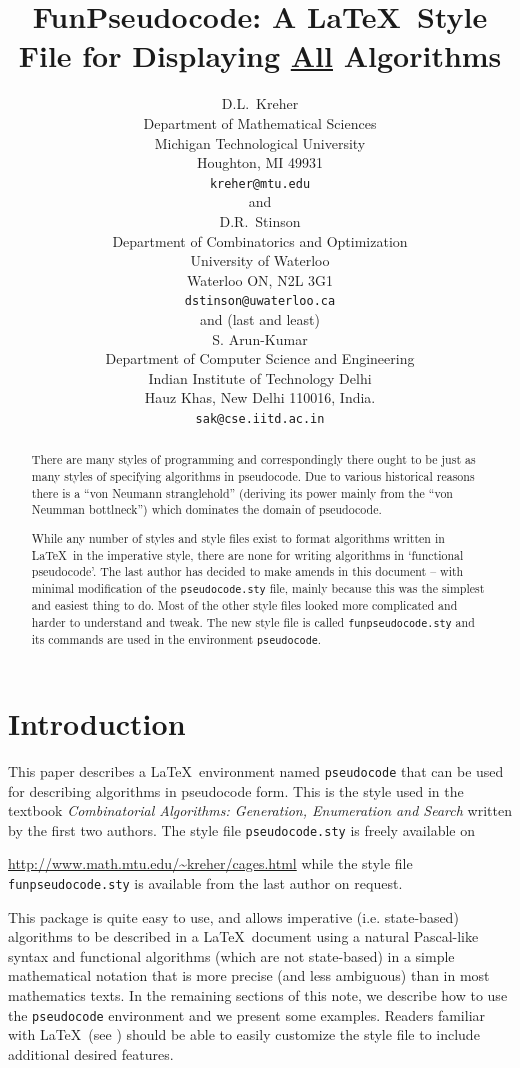 \documentclass[a4]{article}
\title{FunPseudocode: A \LaTeX\  Style File for Displaying \underline{All} Algorithms}
\author{
D.L.\ Kreher\\
Department of Mathematical Sciences\\
Michigan Technological University \\ 
Houghton, MI 49931\\
{\tt kreher@mtu.edu}\\[1ex]
and \\[1ex]
D.R.\ Stinson\\
Department of Combinatorics and Optimization\\
University of Waterloo\\
Waterloo ON, N2L 3G1\\
{\tt dstinson@uwaterloo.ca}\\[1ex]
and (last and least)\\[1ex]
S. Arun-Kumar\\
Department of Computer Science and Engineering\\
Indian Institute of Technology Delhi\\
Hauz Khas, New Delhi 110016, India.\\
{\tt sak@cse.iitd.ac.in}
}
\newcommand{\keyword}[1]{\texttt{#1}}
\begin{document}

\maketitle
\begin{abstract}
  There are many styles of programming and correspondingly there 
  ought to be just as many styles of specifying algorithms in pseudocode.
  Due to various historical reasons there is a ``von Neumann 
  stranglehold'' (deriving its power mainly from the ``von
  Neumman bottlneck''\cite{backus}) which dominates the domain of pseudocode. 

  While any number of styles and style files exist to format algorithms written
  in \LaTeX\ in the imperative style, there are none for writing algorithms in
  `functional pseudocode'. The last author has decided to make amends in this
  document -- with minimal modification of the {\tt pseudocode.sty} file, mainly
  because this was the simplest and easiest thing to do. Most of the other style
  files looked more complicated and harder to understand and tweak. The new
  style file is called \keyword{funpseudocode.sty} and its commands are used in
  the environment \keyword{pseudocode}. 
\end{abstract}

\section{Introduction}

This paper describes a \LaTeX\ environment named \keyword{pseudocode}
that can be used for describing algorithms in pseudocode form.  This
is the style used in the %
textbook {\em Combinatorial Algorithms: Generation, Enumeration and Search}
  \cite{cages} written by the first two authors.
The style file \keyword{pseudocode.sty} is freely available on

\url{http://www.math.mtu.edu/~kreher/cages.html}
while the style file \keyword{funpseudocode.sty} is available from the last
author on request.


This package is quite easy to use, and allows imperative (i.e. state-based)
algorithms to be described in a \LaTeX\ document using a natural Pascal-like
syntax and functional algorithms (which are not state-based) in a simple
mathematical notation that is more precise (and less ambiguous) than in most
mathematics texts.  In the remaining sections of this note, we describe how to
use the \keyword{pseudocode} environment and we present some examples.  Readers
familiar with \LaTeX\ (see \cite{lamport}) should be able to easily customize
the style file to include additional desired features.
\end{document}
